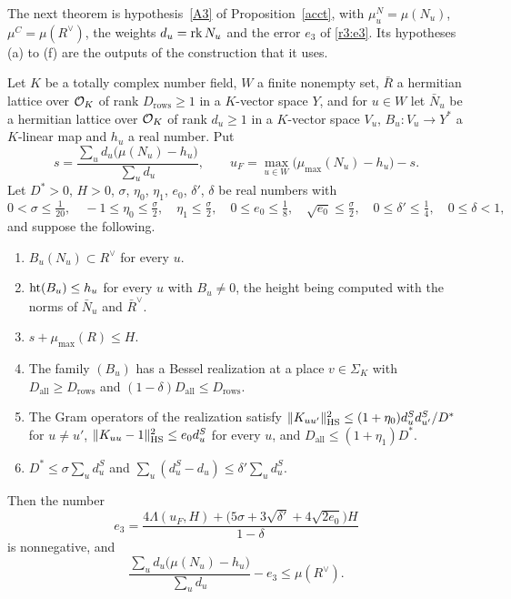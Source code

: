 The next theorem is hypothesis~\eqref{A3} of Proposition~\ref{acct}, with $\mu^N_u=\mu(N_u)$, $\mu^C=\mu(R^\vee)$, the weights $d_u=\operatorname{rk} N_u$ and the error $e_3$ of \eqref{r3:e3}. Its hypotheses (a) to (f) are the outputs of the construction that it uses.

\begin{theorem}\label{r3:A3}
Let $K$ be a totally complex number field, $W$ a finite nonempty set, $\bar R$ a hermitian lattice over $\mathcal O_K$ of rank $D_{\mathrm{rows}}\ge1$ in a $K$-vector space $Y$, and for $u\in W$ let $\bar N_u$ be a hermitian lattice over $\mathcal O_K$ of rank $d_u\ge1$ in a $K$-vector space $V_u$, $B_u\colon V_u\to Y^*$ a $K$-linear map and $h_u$ a real number. Put
\[
s=\frac{\sum_ud_u\big(\mu(N_u)-h_u\big)}{\sum_ud_u},\qquad u_F=\max_{u\in W}\big(\mu_{\max}(N_u)-h_u\big)-s .
\]
Let $D^*>0$, $H>0$, $\sigma$, $\eta_0$, $\eta_1$, $e_0$, $\delta'$, $\delta$ be real numbers with
\[
0<\sigma\le\tfrac1{20},\quad-1\le\eta_0\le\tfrac\sigma2,\quad\eta_1\le\tfrac\sigma2,\quad0\le e_0\le\tfrac18,\quad\sqrt{e_0}\le\tfrac\sigma2,\quad0\le\delta'\le\tfrac14,\quad0\le\delta<1,
\]
and suppose the following.
\begin{enumerate}
\item[(a)] $B_u(N_u)\subset R^\vee$ for every $u$.
\item[(b)] $\operatorname{ht}(B_u)\le h_u$ for every $u$ with $B_u\ne0$, the height being computed with the norms of $\bar N_u$ and $\bar R^\vee$.
\item[(c)] $s+\mu_{\max}(R)\le H$.
\item[(d)] The family $(B_u)$ has a Bessel realization at a place $v\in\Sigma_K$ with $D_{\mathrm{all}}\ge D_{\mathrm{rows}}$ and $(1-\delta)D_{\mathrm{all}}\le D_{\mathrm{rows}}$.
\item[(e)] The Gram operators of the realization satisfy $\lVert K_{uu'}\rVert_{\mathrm{HS}}^2\le(1+\eta_0)d^S_ud^S_{u'}/D^*$ for $u\ne u'$, $\lVert K_{uu}-1\rVert_{\mathrm{HS}}^2\le e_0d^S_u$ for every $u$, and $D_{\mathrm{all}}\le(1+\eta_1)D^*$.
\item[(f)] $D^*\le\sigma\sum_ud^S_u$ and $\sum_u(d^S_u-d_u)\le\delta'\sum_ud^S_u$.
\end{enumerate}
Then the number
\begin{equation}\label{r3:e3}
e_3=\frac{4\Lambda(u_F,H)+\big(5\sigma+3\sqrt{\delta'}+4\sqrt{2e_0}\big)H}{1-\delta}
\end{equation}
is nonnegative, and
\[
\frac{\sum_ud_u\big(\mu(N_u)-h_u\big)}{\sum_ud_u}-e_3\le\mu(R^\vee).
\]
\end{theorem}

